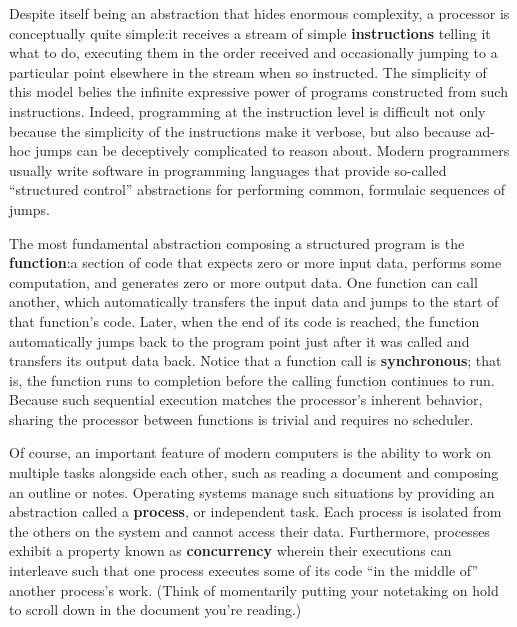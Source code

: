 \documentclass[12pt,letterpaper,openright]{report}
\begin{document}
Despite itself being an abstraction that hides enormous complexity, a processor is
conceptually quite simple:\@ it receives a stream of simple \textbf{instructions}
telling it what to do, executing them in the order received and occasionally jumping
to a particular point elsewhere in the stream when so instructed.  The simplicity of
this model belies the infinite expressive power of programs constructed from such
instructions.  Indeed, programming at the instruction level is difficult not only
because the simplicity of the instructions make it verbose, but also because ad-hoc
jumps can be deceptively complicated to reason about.  Modern programmers usually
write software in programming languages that provide so-called ``structured control''
abstractions for performing common, formulaic sequences of jumps.

The most fundamental abstraction composing a structured program is the
\textbf{function}:\@ a section of code that expects zero or more input data, performs
some computation, and generates zero or more output data.  One function can call
another, which automatically transfers the input data and jumps to the start of that
function's code.  Later, when the end of its code is reached, the function
automatically jumps back to the program point just after it was called and transfers
its output data back.  Notice that a function call is \textbf{synchronous}; that is,
the function runs to completion before the calling function continues to run.
Because such sequential execution matches the processor's inherent behavior, sharing
the processor between functions is trivial and requires no scheduler.

Of course, an important feature of modern computers is the ability to work on
multiple tasks alongside each other, such as reading a document and composing an
outline or notes.  Operating systems manage such situations by providing an
abstraction called a \textbf{process}, or independent task.  Each process is isolated
from the others on the system and cannot access their data.  Furthermore, processes
exhibit a property known as \textbf{concurrency} wherein their executions can
interleave such that one process executes some of its code ``in the middle of''
another process's work.  (Think of momentarily putting your notetaking on hold to
scroll down in the document you're reading.)
\end{document}
